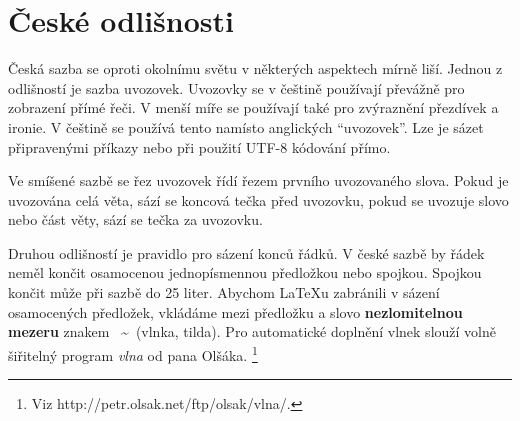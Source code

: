 \documentclass[11pt,twocolumn, a4paper]{article}
\begin{document}
\section{České odlišnosti}
Česká sazba se oproti okolnímu světu v některých as\-pektech mírně liší. Jednou z odlišností je sazba uvo\-zovek. Uvozovky se v češtině používají převážně pro zobrazení přímé řeči. V menší míře se používají také pro zvýraznění přezdívek a ironie. V češtině se použí\-vá tento  namísto anglických ``uvozovek''. Lze je sázet připravenými příkazy nebo při použití UTF-8 kódování přímo.\par
%
Ve smíšené sazbě se řez uvozovek řídí řezem prv\-ního uvozovaného slova. Pokud je uvozována celá věta, sází se koncová tečka před uvozovku, pokud se uvozuje slovo nebo část věty, sází se tečka za uvozovku.\par
%
Druhou odlišností je pravidlo pro sázení konců řád\-ků. V české sazbě by řádek neměl končit osamoce\-nou jednopísmennou předložkou nebo spojkou. Spoj\-kou  končit může při sazbě do 25 liter. Abychom \LaTeX u zabránili v sázení osamocených předložek, vkládáme mezi předložku a slovo \textbf{nezlomitelnou me\-zeru} znakem \ \textasciitilde \ (vlnka, tilda). Pro automatické doplnění vlnek slouží volně šiřitelný program \textsl{vlna} od pana Olšáka. \footnote{Viz http://petr.olsak.net/ftp/olsak/vlna/.}
\end{document}
